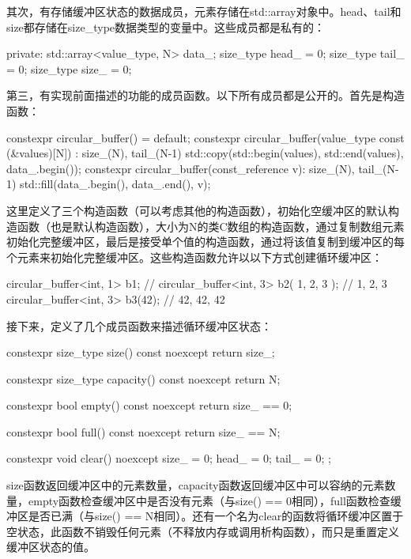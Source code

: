 其次，有存储缓冲区状态的数据成员，元素存储在std::array对象中。head、tail和size都存储在size_type数据类型的变量中。这些成员都是私有的：

\begin{cppcode}
private:
	std::array<value_type, N> data_;
	size_type head_ = 0;
	size_type tail_ = 0;
	size_type size_ = 0;
\end{cppcode}

第三，有实现前面描述的功能的成员函数。以下所有成员都是公开的。首先是构造函数：

\begin{cppcode}
constexpr circular_buffer() = default;
constexpr circular_buffer(value_type const (&values)[N]) :
	size_(N), tail_(N-1)
{
	std::copy(std::begin(values), std::end(values),
	data_.begin());
}
constexpr circular_buffer(const_reference v):
	size_(N), tail_(N-1)
{
	std::fill(data_.begin(), data_.end(), v);
}
\end{cppcode}

这里定义了三个构造函数（可以考虑其他的构造函数），初始化空缓冲区的默认构造函数（也是默认构造函数），大小为N的类C数组的构造函数，通过复制数组元素初始化完整缓冲区，最后是接受单个值的构造函数，通过将该值复制到缓冲区的每个元素来初始化完整缓冲区。这些构造函数允许以以下方式创建循环缓冲区：

\begin{cppcode}
circular_buffer<int, 1> b1; // {}
circular_buffer<int, 3> b2({ 1, 2, 3 }); // {1, 2, 3}
circular_buffer<int, 3> b3(42); // {42, 42, 42}
\end{cppcode}

接下来，定义了几个成员函数来描述循环缓冲区状态：

\begin{cppcode}
constexpr size_type size() const noexcept
{ return size_; }

constexpr size_type capacity() const noexcept
{ return N; }

constexpr bool empty() const noexcept
{ return size_ == 0; }

constexpr bool full() const noexcept
{ return size_ == N; }

constexpr void clear() noexcept
{ size_ = 0; head_ = 0; tail_ = 0; };
\end{cppcode}

size函数返回缓冲区中的元素数量，capacity函数返回缓冲区中可以容纳的元素数量，empty函数检查缓冲区中是否没有元素（与size() == 0相同），full函数检查缓冲区是否已满（与size() == N相同）。还有一个名为clear的函数将循环缓冲区置于空状态，此函数不销毁任何元素（不释放内存或调用析构函数），而只是重置定义缓冲区状态的值。

